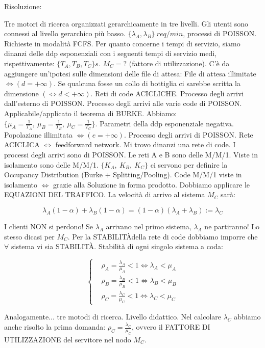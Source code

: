Risoluzione:

Tre motori di ricerca organizzati gerarchicamente in tre livelli. Gli utenti sono connessi al livello gerarchico più basso. $\{\lambda_A,\lambda_B\}\ req/min$, processi di POISSON. Richieste in modalità FCFS. Per quanto concerne i tempi di servizio, siamo dinanzi delle ddp esponenziali con i seguenti tempi di servizio medi, rispettivamente: $\{T_A, T_B, T_C\}s$. $M_C=?$ (fattore di utilizzazione). C'è da aggiungere un'ipotesi sulle dimensioni delle file di attesa: File di attesa illimitate $\iff (d=+\infty)$. Se qualcuna fosse un collo di bottiglia ci sarebbe scritta la dimensione $(\iff d<+\infty)$. Reti di code ACICLICHE. Processo degli arrivi dall'esterno di POISSON. Processo degli arrivi alle varie code di POISSON. Applicabile/applicato il teorema di BURKE. Abbiamo: $\{\mu_A=\frac{1}{T_A},\ \mu_B=\frac{1}{T_B},\ \mu_C=\frac{1}{T_C}\}$. Parametri della ddp esponenziale negativa. Popolazione illimitata $\iff (e=+\infty)$. Processo degli arrivi di POISSON. Rete ACICLICA $\iff$ feedforward network. Mi trovo dinanzi una rete di code. I processi degli arrivi sono di POISSON. Le reti A e B sono delle M/M/1. Viste in isolamento sono delle M/M/1. $\{K_A,\ K_B,\ K_C\}$ ci servono per definire la Occupancy Distribution (Burke + Splitting/Pooling). Code M/M/1 viste in isolamento $\iff$ grazie alla Soluzione in forma prodotto. Dobbiamo applicare le EQUAZIONI DEL TRAFFICO. La velocità di arrivo al sistema $M_C$ sarà:

\[
	\lambda_A(1-\alpha) + \lambda_B(1-\alpha) = (1-\alpha)(\lambda_A+\lambda_B) := \lambda_C
\]

I clienti NON si perdono! Se $\lambda_A$ arrivano nel primo sistema, $\lambda_A$ ne partiranno! Lo stesso dicasi per $M_C$. Per la STABILIT\`Adella rete di code dobbiamo imporre che $\forall$ sistema vi sia STABILIT\`A. Stabilità di ogni singolo sistema a coda:

\[
	\left\{
	\begin{aligned}
	&\rho_A = \frac{\lambda_A}{\mu_A}<1 \iff \lambda_A<\mu_A\\
	&\rho_B = \frac{\lambda_B}{\mu_B}<1 \iff \lambda_B<\mu_B\\
	&\rho_C = \frac{\lambda_C}{\mu_C}<1 \iff \lambda_C<\mu_C
	\end{aligned}
	\right.
\]

Analogamente... tre motodi di ricerca. Livello didattico. Nel calcolare $\lambda_C$ abbiamo anche risolto la prima domanda: $\rho_C=\frac{\lambda_C}{\mu_C}$, ovvero il FATTORE DI UTILIZZAZIONE del servitore nel nodo $M_C$. 

